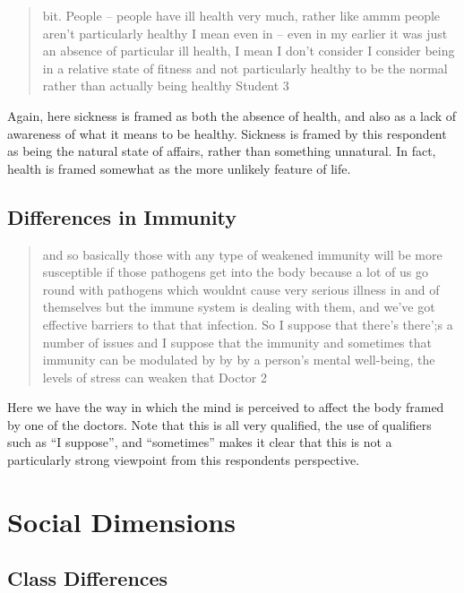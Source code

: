 \begin{quotation}
  bit. People – people have ill health very much, rather like ammm people aren't particularly healthy I mean even in – even in my earlier it was just an absence of particular ill health, I mean I don't consider I consider being in a relative state of fitness and not particularly healthy to be the normal rather than actually being healthy 
Student 3
\end{quotation}

Again, here sickness is framed as both the absence of health, and also as a lack of awareness of what it means to be healthy. Sickness is framed by this respondent as being the natural state of affairs, rather than something unnatural. In fact, health is framed somewhat as the more unlikely feature of life. 

\subsection{Differences in Immunity}
\label{sec:differences-immunity}

\begin{quotation}
  and so basically those with any type of weakened immunity will be more susceptible if those pathogens get into the body because a lot of us go round with pathogens which wouldnt cause very serious illness in and of themselves but the immune system is dealing with them, and we've got effective barriers to that that infection. So I suppose that there's there';s a number of issues and I suppose that the immunity and sometimes that immunity can be modulated  by by by a person's mental well-being, the levels of stress can weaken that 
Doctor 2
\end{quotation}

Here we have the way in which the mind is perceived to affect the body framed by one of the doctors. Note that this is all very qualified, the use of qualifiers such as ``I suppose'', and ``sometimes'' makes it clear that this is not a particularly strong viewpoint from this respondents perspective. 


\section{Social Dimensions}
\label{sec:social-dimensions}

\subsection{Class Differences}
\label{sec:class-differences}

